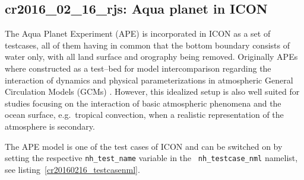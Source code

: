 \subsection[cr2016\_02\_16\_rjs: Aqua planet in ICON]{cr2016\_02\_16\_rjs:
  Aqua planet in ICON}\label{cr20140715rjs}

The Aqua Planet Experiment (APE) is incorporated in ICON as a set of 
testcases, all of them having in common that the bottom boundary
consists of water only, with all land surface and orography being
removed. Originally APEs where constructed as a test--bed for model
intercomparison regarding the interaction of dynamics and physical
parameterizations in atmospheric General Circulation Models (GCMs)
\cite{nea019,nea010}. However, this idealized setup is also well
suited for studies focusing on the interaction of basic atmospheric
phenomena and the ocean surface, e.g.~tropical convection, when a
realistic representation of the atmosphere is secondary. 

The APE model is one of the test cases of ICON and can be switched on
by setting the respective {\tt nh\_test\_name} variable in the {\tt
  nh\_testcase\_nml} namelist, see listing~\ref{cr20160216_testcasenml}.

